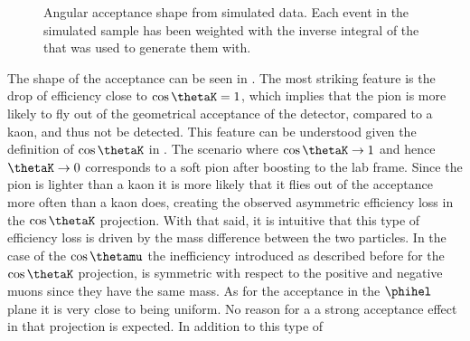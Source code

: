 \begin{figure}[t]
  \centering
  \begin{subfigure}{0.49\textwidth}
    \scalebox{1.15}{}
    \caption{}
    \label{angAcc_ctk}
  \end{subfigure}%
  \hfill%
  \begin{subfigure}{0.49\textwidth}
    \scalebox{1.15}{}
    \caption{}
    \label{angAcc_ctl}
  \end{subfigure}
  \vspace*{0.02\textwidth}
  \begin{subfigure}{0.49\textwidth}
    \scalebox{1.15}{}
    \caption{}
    \label{angAcc_phi}
  \end{subfigure}
  \caption{Angular acceptance shape from simulated data. Each event in the simulated sample has been weighted with the inverse integral
           of the \pdf that was used to generate them with.}
  \label{angAcc_all}
\end{figure}

The shape of the acceptance can be seen in . The most striking feature is the drop of efficiency
close to $\cos\thetaK=1$, which implies that the pion is more likely to fly out of the geometrical acceptance of the detector, compared to a kaon,
and thus not be detected. This feature can be understood given the  definition of $\cos\thetaK$ in .
The scenario where $\cos\thetaK\rightarrow 1$ and hence $\thetaK \rightarrow 0$ corresponds to a soft pion after boosting
to the lab frame. Since the pion is lighter than a kaon it is more likely that it flies out of the acceptance more
often than a kaon does, creating the observed asymmetric efficiency loss in the $\cos\thetaK$ projection. With that said, it is intuitive that
this type of efficiency loss is driven by the mass difference between the two particles. In the case of the $\cos\thetamu$ the
inefficiency introduced as described before for the $\cos\thetaK$ projection, is symmetric with respect to the positive and negative muons since
they have the same mass. As for the acceptance in the $\phihel$ plane it is very close to being uniform.
No reason for a a strong acceptance effect in that projection is expected. In addition to this type of

